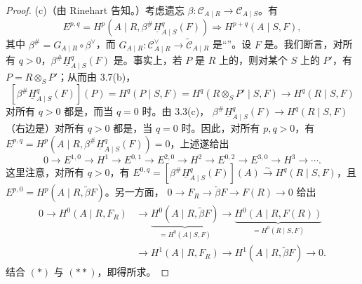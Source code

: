 \begin{proof}
(c)（由 Rinehart 告知。）考虑遗忘 $\beta:\mathcal C_{A\mid R}\to\mathcal C_{A\mid S}$。有
\[E^{p,q}=H^p(A\mid R,\beta^{\#}\underline H^q_{A\mid S}(F))\Longrightarrow H^{p+q}(A\mid S,F),\]
其中 $\beta^{\#}=G_{A\mid R}\circ\beta^{\vee}$，而 $G_{A\mid R}:\mathcal C_{A\mid R}^{\vee}\to\widetilde{\mathcal C}_{A\mid R}$ 是“”。设 $F$ 是。我们断言，对所有 $q>0$，$\beta^{\#}\underline H^q_{A\mid S}(F)$ 是。事实上，若 $P$ 是 $R$ 上的，则对某个 $S$ 上的 $P'$，有 $P=R\otimes_S P'$；从而由 3.7(b)，
\[[\beta^{\#}\underline H^q_{A\mid S}(F)](P)=H^q(P\mid S,F)=H^q(R\otimes_S P'\mid S,F)\longrightarrow H^q(R\mid S,F)\]
对所有 $q>0$ 都是，而当 $q=0$ 时。由 3.3(c)， $\beta^{\#}\underline H^q_{A\mid S}(F)\to H^q(R\mid S,F)$（右边是）对所有 $q>0$ 都是，当 $q=0$ 时。因此，对所有 $p,q>0$，有 $E^{p,q}=H^p(A\mid R,\beta^{\#}\underline H^q_{A\mid S}(F))=0$，上述遂给出
\[0\to E^{1,0}\to H^1\to E^{0,1}\to E^{2,0}\to H^2\to E^{0,2}\to E^{3,0}\to H^3\to\cdots.\tag{*}\]
这里注意，对所有 $q>0$，有 $E^{0,q}=[\beta^{\#}\underline H^q_{A\mid S}(F)](A)\xrightarrow{\sim}H^q(R\mid S,F)$，且 $E^{p,0}=H^p(A\mid R,\widetilde\beta F)$。另一方面， $0\to F_R\to\widetilde\beta F\to F(R)\to0$ 给出
\[
\begin{aligned}
0\to H^0(A\mid R,F_R)&\to\underbrace{H^0(A\mid R,\widetilde\beta F)}_{=H^0(A\mid S,F)}
\to\underbrace{H^0(A\mid R,F(R))}_{=H^0(R\mid S,F)}\\
&\to H^1(A\mid R,F_R)\to H^1(A\mid R,\widetilde\beta F)\to0.
\end{aligned}\tag{**}
\]
结合 $(*)$ 与 $(**)$，即得所求。
\end{proof}

